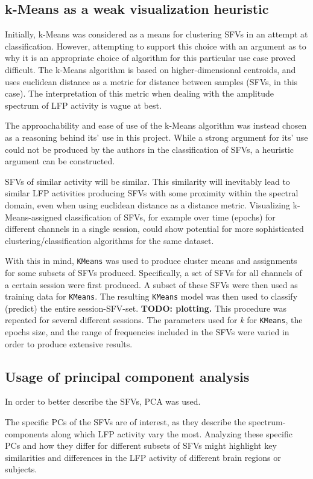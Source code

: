 \documentclass{article}
\begin{document}
\subsection{k-Means as a weak visualization heuristic}
Initially, k-Means was considered as a means for clustering SFVs in an attempt at classification. 
However, attempting to support this choice with an argument as to why it is an appropriate choice of algorithm for this particular use case proved difficult.
The k-Means algorithm is based on higher-dimensional centroids, and uses euclidean distance as a metric for distance between samples (SFVs, in this case).
The interpretation of this metric when dealing with the amplitude spectrum of LFP activity is vague at best.

The approachability and ease of use of the k-Means algorithm was instead chosen as a reasoning behind its' use in this project.
While a strong argument for its' use could not be produced by the authors in the classification of SFVs, a heuristic argument can be constructed.

SFVs of similar activity will be similar.
This similarity will inevitably lead to similar LFP activities producing SFVs with some proximity within the spectral domain, even when using euclidean distance as a distance metric.
Visualizing k-Means-assigned classification of SFVs, for example over time (epochs) for different channels in a single session, could show potential for more sophisticated clustering/classification algorithms for the same dataset. 

With this in mind, \texttt{KMeans} was used to produce cluster means and assignments for some subsets of SFVs produced.
Specifically, a set of SFVs for all channels of a certain session were first produced.
A subset of these SFVs were then used as training data for \texttt{KMeans}.
The resulting \texttt{KMeans} model was then used to classify (predict) the entire session-SFV-set.
\textbf{TODO: plotting.}
This procedure was repeated for several different sessions.
The parameters used for \textit{k} for \texttt{KMeans}, the epochs size, and the range of frequencies included in the SFVs were varied in order to produce extensive results. 

\subsection{Usage of principal component analysis}
In order to better describe the SFVs, PCA was used.

The specific PCs of the SFVs are of interest, as they describe the spectrum-components along which LFP activity vary the most.
Analyzing these specific PCs and how they differ for different subsets of SFVs might highlight key similarities and differences in the LFP activity of different brain regions or subjects.
\end{document}
